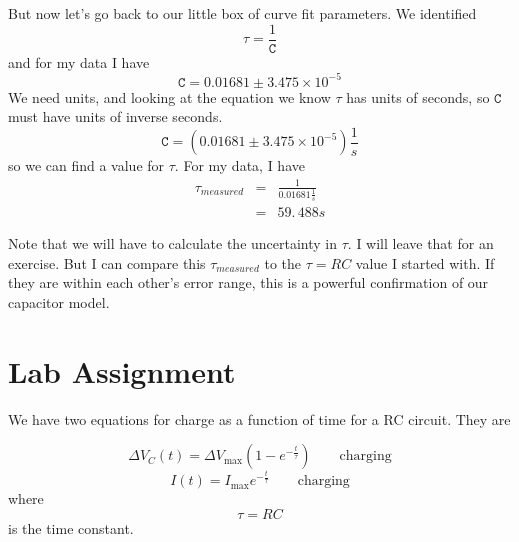 But now let's go back to our little box of curve fit parameters. We
identified 
\begin{equation*}
\tau =\frac{1}{\mathtt{C}}
\end{equation*}%
and for my data I have 
\begin{equation*}
\mathtt{C}=0.01681\pm 3.475\times 10^{-5}
\end{equation*}%
\newline
We need units, and looking at the equation we know $\tau $ has units of
seconds, so $\mathtt{C}$ must have units of inverse seconds.%
\begin{equation*}
\mathtt{C}=\left( 0.01681\pm 3.475\times 10^{-5}\right) \frac{1}{\unit{s}}
\end{equation*}%
so we can find a value for $\tau .$ For my data, I have 
\begin{eqnarray*}
\tau _{measured} &=&\frac{1}{0.01681\frac{1}{\unit{s}}} \\
&=&59.\,\allowbreak 488\unit{s}
\end{eqnarray*}

Note that we will have to calculate the uncertainty in $\tau .$ I will leave
that for an exercise. But I can compare this $\tau _{measured}$ to the $\tau
=RC$ value I started with. If they are within each other's error range, this
is a powerful confirmation of our capacitor model.

\vspace*{\fill}%
\pagebreak

\section{Lab Assignment}

We have two equations for charge as a function of time for a RC circuit.
They are

\begin{equation*}
\Delta V_{C}\left( t\right) =\Delta V_{\max }\left( 1-e^{-\frac{t}{\tau }%
}\right) \qquad \text{charging}
\end{equation*}%
\begin{equation*}
I\left( t\right) =I_{\max }e^{-\frac{t}{\tau }}\qquad \text{charging}
\end{equation*}%
where 
\begin{equation}
\tau =RC
\end{equation}%
is the time constant.

